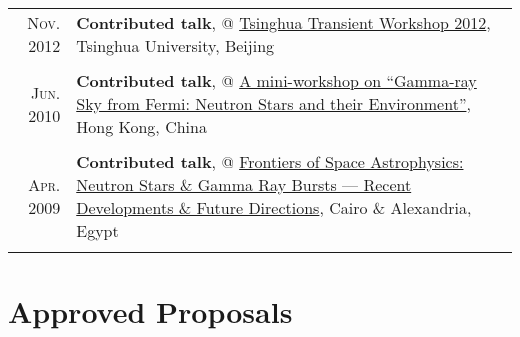 \documentclass[letterpaper,12pt]{article}
\newcommand{\textwrap}{5.3in}       %
\begin{document}
\begin{longtable}{r|p{\textwrap}}
    \textsc{Nov. 2012}   &   \textbf{Contributed talk}, @ \href{http://www.phys.tsinghua.edu.cn/publish/phy/5287/2012/20121102084855753317440/20121102084855753317440_.html}{Tsinghua Transient Workshop 2012}, Tsinghua University, Beijing   \\
    \multicolumn{2}{c}{} \\

    \textsc{Jun. 2010}   &   \textbf{Contributed talk}, @ \href{http://www.physics.hku.hk/~astro/2010Astro/Index.htm}{A mini-workshop on ``Gamma-ray Sky from Fermi: Neutron Stars and their Environment''}, Hong Kong, China  \\
    \multicolumn{2}{c}{} \\

    \textsc{Apr. 2009}   &   \textbf{Contributed talk}, @ \href{http://www.ns-grb.com/index0.html}{Frontiers of Space Astrophysics: Neutron Stars \& Gamma Ray Bursts --- Recent Developments \& Future Directions}, Cairo \& Alexandria, Egypt     \\
    \multicolumn{2}{c}{}

\end{longtable}
\endgroup



\vspace*{-.7em}
\section{Approved Proposals}
\end{document}
